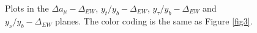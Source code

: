\documentclass[12pt]{article}
\begin{document}


\begin{figure}[ht!]
\centering
{}
\caption{Plots in the $\Delta a_{\mu}-\Delta_{EW}$, $y_{t}/y_{b}-\Delta_{EW}$, $y_{\tau}/y_{b}-\Delta_{EW}$ and $y_{\nu}/y_{b}-\Delta_{EW}$ planes. The color coding is the same as Figure \ref{fig3}.}
\label{fig6}
\end{figure}

\end{document}
